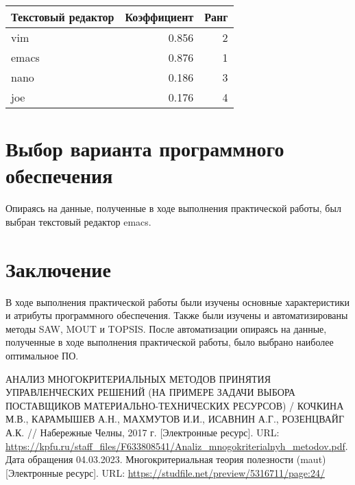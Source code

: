 \begin{table}[h!tp]
	\centering
	\caption{}
	\label{table:topsis:result}
	\begin{tabular}{|l|r|r|}
		\hline Текстовый редактор & Коэффициент & Ранг\\ \hline
		vim & 0.856 & 2\\ \hline
		emacs & 0.876 & 1\\ \hline
		nano & 0.186 & 3\\ \hline
		joe & 0.176 & 4\\ \hline
	\end{tabular}
\end{table}

\section{Выбор варианта программного обеспечения}
Опираясь на данные, полученные в ходе выполнения практической
работы, был выбран текстовый редактор emacs.

\clearpage

\section*{\LARGE Заключение}
В ходе выполнения практической работы были изучены основные характеристики и
атрибуты программного обеспечения. Также были изучены и
автоматизированы методы SAW, MOUT и TOPSIS. После автоматизации
опираясь на данные, полученные в ходе выполнения практической работы,
было выбрано наиболее оптимальное ПО.

\clearpage

\begin{thebibliography}{0}
		АНАЛИЗ МНОГОКРИТЕРИАЛЬНЫХ МЕТОДОВ ПРИНЯТИЯ
		УПРАВЛЕНЧЕСКИХ РЕШЕНИЙ
		(НА ПРИМЕРЕ ЗАДАЧИ ВЫБОРА ПОСТАВЩИКОВ
		МАТЕРИАЛЬНО-ТЕХНИЧЕСКИХ РЕСУРСОВ) /
		КОЧКИНА М.В., КАРАМЫШЕВ А.Н., МАХМУТОВ И.И.,
		ИСАВНИН А.Г., РОЗЕНЦВАЙГ А.К. // Набережные Челны, 2017 г.
		[Электронные ресурс]. URL:
		\url{https://kpfu.ru/staff_files/F633808541/Analiz_mnogokriterialnyh_metodov.pdf}.
		Дата обращения 04.03.2023.
	 Многокритериальная теория полезности (maut)
		[Электронные ресурс]. URL:
		\url{https://studfile.net/preview/5316711/page:24/}
\end{thebibliography}
